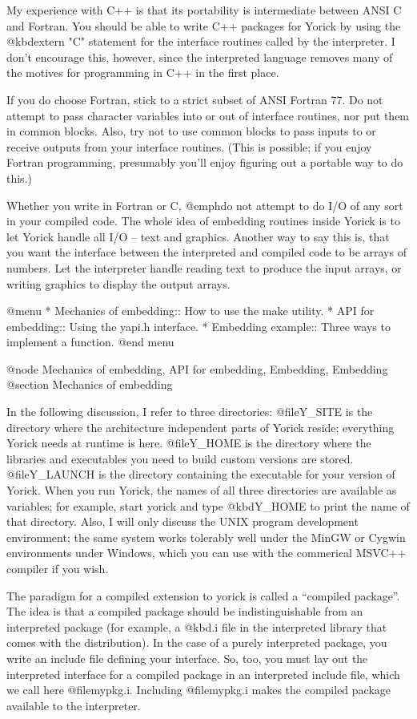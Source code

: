 My experience with C++ is that its portability is intermediate between
ANSI C and Fortran.  You should be able to write C++ packages for Yorick
by using the @kbd{extern "C"} statement for the interface routines
called by the interpreter.  I don't encourage this, however, since the
interpreted language removes many of the motives for programming in C++
in the first place.

If you do choose Fortran, stick to a strict subset of ANSI Fortran 77.
Do not attempt to pass character variables into or out of interface
routines, nor put them in common blocks.  Also, try not to use common
blocks to pass inputs to or receive outputs from your interface
routines.  (This is possible; if you enjoy Fortran programming,
presumably you'll enjoy figuring out a portable way to do this.)

Whether you write in Fortran or C, @emph{do not} attempt to do I/O of
any sort in your compiled code.  The whole idea of embedding routines
inside Yorick is to let Yorick handle all I/O -- text and graphics.
Another way to say this is, that you want the interface between the
interpreted and compiled code to be arrays of numbers.  Let the
interpreter handle reading text to produce the input arrays, or
writing graphics to display the output arrays.

@menu
* Mechanics of embedding::      How to use the make utility.
* API for embedding::           Using the yapi.h interface.
* Embedding example::           Three ways to implement a function.
@end menu

@node Mechanics of embedding, API for embedding, Embedding, Embedding
@section Mechanics of embedding

In the following discussion, I refer to three directories:
@file{Y_SITE} is the directory where the architecture independent
parts of Yorick reside; everything Yorick needs at runtime is here.
@file{Y_HOME} is the directory where the libraries and executables you
need to build custom versions are stored.  @file{Y_LAUNCH} is the
directory containing the executable for your version of Yorick.  When
you run Yorick, the names of all three directories are available as
variables; for example, start yorick and type @kbd{Y_HOME} to print
the name of that directory.  Also, I will only discuss the UNIX
program development environment; the same system works tolerably well
under the MinGW or Cygwin environments under Windows, which you can
use with the commerical MSVC++ compiler if you wish.

The paradigm for a compiled extension to yorick is called a ``compiled
package''.  The idea is that a compiled package should be
indistinguishable from an interpreted package (for example, a @kbd{.i}
file in the interpreted library that comes with the distribution).  In
the case of a purely interpreted package, you write an include file
defining your interface.  So, too, you must lay out the interpreted
interface for a compiled package in an interpreted include file, which
we call here @file{mypkg.i}.  Including @file{mypkg.i} makes the
compiled package available to the interpreter.

